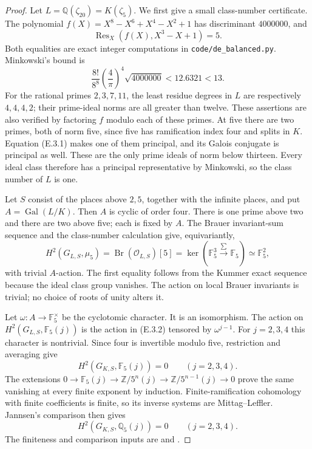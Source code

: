\begin{proof}
Let \(L=\mathbb Q(\zeta_{20})=K(\zeta_5)\).
We first give a small class-number certificate. The polynomial
\(f(X)=X^8-X^6+X^4-X^2+1\) has discriminant \(4000000\),
and
\[
 \operatorname{Res}_X(f(X),X^3-X+1)=5.                 \tag{E.3.1}
\]
Both equalities are exact integer computations in
\texttt{code/de\_balanced.py}. Minkowski's bound is
\[
 \frac{8!}{8^8}\left(\frac4\pi\right)^4\sqrt{4000000}
 < 12.6321 <13.
\]
For the rational primes \(2,3,7,11\), the least residue degrees
in \(L\) are respectively \(4,4,4,2\); their prime-ideal norms
are all greater than twelve. These assertions are also verified
by factoring \(f\) modulo each of these primes. At five there
are two primes, both of norm five, since five has ramification
index four and splits in \(K\). Equation (E.3.1) makes one
of them principal, and its Galois conjugate is principal as
well. These are the only prime ideals of norm below thirteen.
Every ideal class therefore has a principal representative by
Minkowski, so the class number of \(L\) is one.

Let \(S\) consist of the places above \(2,5\), together with
the infinite places, and put \(A=\operatorname{Gal}(L/K)\).
Then \(A\) is cyclic of order four. There is one prime above
two and there are two above five; each is fixed by \(A\).
The Brauer invariant-sum sequence and the class-number
calculation give, equivariantly,
\[
 H^2(G_{L,S},\mu_5)
 =\operatorname{Br}(\mathcal O_{L,S})[5]
 =\ker(\mathbb F_5^3\xrightarrow{\sum}\mathbb F_5)
 \simeq\mathbb F_5^2,                                  \tag{E.3.2}
\]
with trivial \(A\)-action. The first equality follows from
the Kummer exact sequence because the ideal class group
vanishes. The action on local Brauer invariants is trivial;
no choice of roots of unity alters it.

Let \(\omega:A\to\mathbb F_5^\times\) be the cyclotomic
character. It is an isomorphism. The action on
\(H^2(G_{L,S},\mathbb F_5(j))\) is the action in (E.3.2)
tensored by \(\omega^{j-1}\). For \(j=2,3,4\) this character
is nontrivial. Since four is invertible modulo five,
restriction and averaging give
\[
 H^2(G_{K,S},\mathbb F_5(j))=0\qquad(j=2,3,4).           \tag{E.3.3}
\]
The extensions
\(0\to\mathbb F_5(j)\to\mathbb Z/5^n(j)
\to\mathbb Z/5^{n-1}(j)\to0\) prove the same vanishing
at every finite exponent by induction. Finite-ramification
cohomology with finite coefficients is finite, so its
inverse systems are Mittag--Leffler. Jannsen's comparison
then gives
\[
 H^2(G_{K,S},\mathbb Q_5(j))=0\qquad(j=2,3,4).           \tag{E.3.4}
\]
The finiteness and comparison inputs are
\cite[I, Corollary 4.15]{DE_MilneADT} and
\cite[Proposition 1.6, Theorem 2.2]{DE_Jannsen1988}.


\end{proof}
